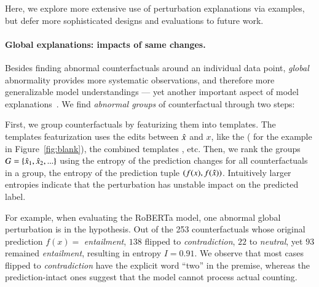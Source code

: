 Here, we explore more extensive use of perturbation explanations via examples, but defer more sophisticated designs and evaluations to future work.

\paragraph{Global explanations: impacts of same changes.}
Besides finding abnormal counterfactuals around an individual data point, \emph{global} abnormality provides more systematic observations, and therefore more generalizable model understandings --- yet another important aspect of model explanations~\cite{miller}.
We find \emph{abnormal groups} of counterfactual through two steps: 

First, we group counterfactuals by featurizing them into templates. 
The templates featurization uses the edits between $\hat{x}$ and $x$, like the \tagstr ( for the example in Figure~\ref{fig:blank}), the combined templates , etc.
Then, we rank the groups $G = \{ \hat{x}_1, \hat{x}_2, ...\}$ using the entropy of the prediction changes for all counterfactuals in a group, \ie the entropy of the prediction tuple $(f(x), f(\hat{x}))$.
Intuitively larger entropies indicate that the perturbation has unstable impact on the predicted label.

For example, when evaluating the \nli RoBERTa model, one abnormal global perturbation is  in the hypothesis.
Out of the 253 counterfactuals whose original prediction $f(x)=$ \emph{entailment}, $138$ flipped to \emph{contradiction}, $22$ to \emph{neutral}, yet $93$ remained \emph{entailment}, resulting in entropy $I=0.91$.
We observe that most cases flipped to \emph{contradiction} have the explicit word ``two'' in the premise, whereas the prediction-intact ones suggest that the model cannot process actual counting.


